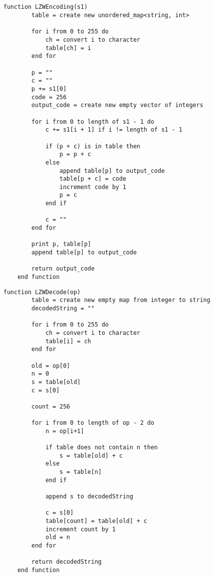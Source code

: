 \begin{appendices}
    \chapter{}
    \begin{lstlisting}[caption={Кодирование методом LZW}, label={lst:lzw-encoding}, tabsize=2]
    function LZWEncoding(s1)
        table = create new unordered_map<string, int>
    
        for i from 0 to 255 do
            ch = convert i to character
            table[ch] = i
        end for
    
        p = ""
        c = ""
        p += s1[0]
        code = 256
        output_code = create new empty vector of integers
    
        for i from 0 to length of s1 - 1 do
            c += s1[i + 1] if i != length of s1 - 1
    
            if (p + c) is in table then
                p = p + c
            else
                append table[p] to output_code
                table[p + c] = code
                increment code by 1
                p = c
            end if
    
            c = ""
        end for
    
        print p, table[p]
        append table[p] to output_code
    
        return output_code
    end function
    \end{lstlisting}
    \begin{lstlisting}[caption={Кодирование методом LZW}, label={lst:lzw-decoding}, tabsize=2]
    function LZWDecode(op)
        table = create new empty map from integer to string
        decodedString = ""
    
        for i from 0 to 255 do
            ch = convert i to character
            table[i] = ch
        end for
    
        old = op[0]
        n = 0
        s = table[old]
        c = s[0]
    
        count = 256
    
        for i from 0 to length of op - 2 do
            n = op[i+1]
    
            if table does not contain n then
                s = table[old] + c
            else
                s = table[n]
            end if
    
            append s to decodedString
    
            c = s[0]
            table[count] = table[old] + c
            increment count by 1
            old = n
        end for
    
        return decodedString
    end function
    \end{lstlisting}
\end{appendices}